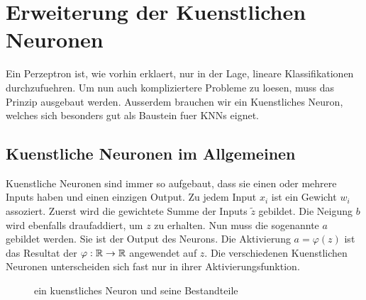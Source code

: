 \section{Erweiterung der Kuenstlichen Neuronen}\label{sec:kuenstlicheNeuronen}
Ein Perzeptron ist, wie vorhin erklaert, nur in der Lage, lineare Klassifikationen
durchzufuehren. Um nun auch kompliziertere Probleme zu loesen, muss das Prinzip
ausgebaut werden. Ausserdem brauchen wir ein Kuenstliches Neuron, welches sich
besonders gut als Baustein fuer KNNs eignet.


\subsection{Kuenstliche Neuronen im Allgemeinen}
Kuenstliche Neuronen sind immer so aufgebaut, dass sie einen oder mehrere Inputs
haben und einen einzigen Output. Zu jedem Input $x_i$ ist ein Gewicht
$w_{i}$ assoziert. Zuerst wird die gewichtete Summe der Inputs $\tilde{z}$ gebildet.
Die Neigung $b$ wird ebenfalls draufaddiert, um $z$ zu erhalten. Nun muss
die sogenannte  $a$ gebildet werden. Sie ist der Output des Neurons.
Die Aktivierung $a = \varphi(z)$ ist das Resultat der
 $\varphi: \mathbb{R} \to \mathbb{R}$ angewendet
auf $z$. Die verschiedenen Kuenstlichen Neuronen unterscheiden
sich fast nur in ihrer Aktivierungsfunktion.
\\
\begin{figure}[h!]

  \caption{ein kuenstliches Neuron und seine Bestandteile}
\end{figure}
\\

\para{}
\cite{Nielsen}
\cite{wiki:kuenstliches_neuron}

